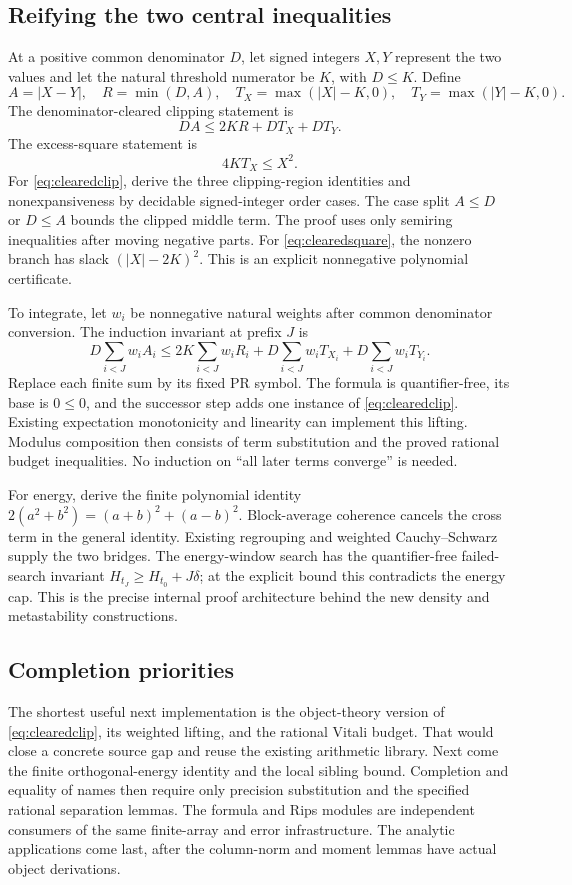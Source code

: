 \subsection{Reifying the two central inequalities}

At a positive common denominator \(D\), let signed integers \(X,Y\)
represent the two values and let the natural threshold numerator be
\(K\), with \(D\leq K\). Define
\[
 A=|X-Y|,\quad R=\min(D,A),\quad
 T_X=\max(|X|-K,0),\quad T_Y=\max(|Y|-K,0).
\]
The denominator-cleared clipping statement is
\[
 D A\leq2KR+DT_X+DT_Y.
 \tag{C}\label{eq:clearedclip}
\]
The excess-square statement is
\[
                    4KT_X\leq X^2.
 \tag{S}\label{eq:clearedsquare}
\]
For \eqref{eq:clearedclip}, derive the three clipping-region identities
and nonexpansiveness by decidable signed-integer order cases. The
case split \(A\leq D\) or \(D\leq A\) bounds the clipped middle
term. The proof uses only semiring inequalities after moving negative
parts. For \eqref{eq:clearedsquare}, the nonzero branch has slack
\((|X|-2K)^2\). This is an explicit nonnegative polynomial
certificate.

To integrate, let \(w_i\) be nonnegative natural weights after common
denominator conversion. The induction invariant at prefix \(J\) is
\[
 D\sum_{i<J}w_i A_i
 \leq 2K\sum_{i<J}w_i R_i
       +D\sum_{i<J}w_i T_{X_i}+D\sum_{i<J}w_i T_{Y_i}.
\]
Replace each finite sum by its fixed PR symbol. The formula is
quantifier-free, its base is \(0\leq0\), and the successor step adds
one instance of \eqref{eq:clearedclip}. Existing expectation
monotonicity and linearity can implement this lifting. Modulus
composition then consists of term substitution and the proved rational
budget inequalities. No induction on ``all later terms converge'' is
needed.

For energy, derive the finite polynomial identity
\(2(a^2+b^2)=(a+b)^2+(a-b)^2\). Block-average coherence cancels the
cross term in the general identity. Existing regrouping and weighted
Cauchy--Schwarz supply the two bridges. The energy-window search
has the quantifier-free failed-search invariant
\(H_{t_J}\geq H_{t_0}+J\delta\); at the explicit bound this
contradicts the energy cap. This is the precise internal proof
architecture behind the new density and metastability constructions.

\subsection{Completion priorities}

The shortest useful next implementation is the object-theory version
of \eqref{eq:clearedclip}, its weighted lifting, and the rational
Vitali budget. That would close a concrete source gap and reuse the
existing arithmetic library. Next come the finite orthogonal-energy
identity and the local sibling bound. Completion and equality of names
then require only precision substitution and the specified rational
separation lemmas. The formula and Rips modules are independent
consumers of the same finite-array and error infrastructure. The
analytic applications come last, after the column-norm and moment
lemmas have actual object derivations.
